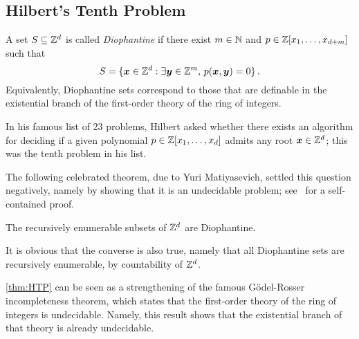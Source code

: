 \subsection{Hilbert's Tenth Problem}

A set $S \subseteq \mathbb{Z}^{d}$ is called \emph{Diophantine} if there exist $m \in \mathbb{N}$ and $p \in \mathbb{Z}[x_{1}, \ldots, x_{d+m}]$ such that
\[ S = \lbrace \boldsymbol{x} \in \mathbb{Z}^{d} : \exists \boldsymbol{y} \in \mathbb{Z}^{m}, \, p(\boldsymbol{x}, \boldsymbol{y}) = 0 \rbrace \, . \]
Equivalently, Diophantine sets correspond to those that are definable in the existential branch of the first-order theory of the ring of integers.

In his famous list of 23 problems, Hilbert asked whether there exists an algorithm for deciding if a given polynomial $p \in \mathbb{Z}[x_{1}, \ldots, x_{d}]$ admits any root $\boldsymbol{x} \in \mathbb{Z}^{d}$; this was the tenth problem in his list.

The following celebrated theorem, due to Yuri Matiyasevich, settled this question negatively, namely by showing that it is an undecidable problem; see~\cite{HTP} for a self-contained proof.

\begin{theorem}[Matiyasevich]
\label{thm:HTP}
The recursively enumerable subsets of $\mathbb{Z}^{d}$ are Diophantine.
\end{theorem}

It is obvious that the converse is also true, namely that all Diophantine sets are recursively enumerable, by countability of $\mathbb{Z}^{d}$.

\cref{thm:HTP} can be seen as a strengthening of the famous G\"{o}del-Rosser incompleteness theorem, which states that the first-order theory of the ring of integers is undecidable. Namely, this result shows that the existential branch of that theory is already undecidable.

